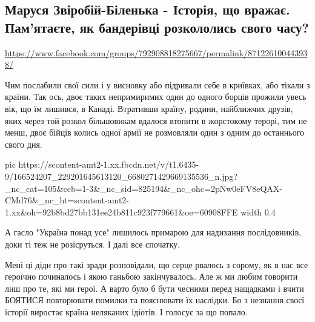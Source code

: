  
 
 
 
 

\subsection{Маруся Звіробій-Біленька - Історія, що вражає. Пам'ятаєте, як бандерівці розкололись свого часу? }
\url{https://www.facebook.com/groups/792908818275667/permalink/871226100443938/}

Чим послабили свої сили і у висновку або підривали себе в криївках, або тікали
з країни. Так ось, двоє таких непримиримих один до одного борців прожили увесь
вік, що їм лишився, в Канаді. Втративши країну, родини, найближчих друзів, яких
через той розкол більшовикам вдалося втопити в жорстокому терорі, тим не менш,
двоє бійців колись одної армії не розмовляли один з одним до останнього свого
дня. 


\ifcmt
  pic https://scontent-amt2-1.xx.fbcdn.net/v/t1.6435-9/166524207_229201645613120_6680271429669135536_n.jpg?_nc_cat=105&ccb=1-3&_nc_sid=825194&_nc_ohc=2pNw0eFV8eQAX-CMd76&_nc_ht=scontent-amt2-1.xx&oh=92b8bd27bb131ee24b811c923f779661&oe=60908FFE
  width 0.4
\fi


А гасло "Україна понад усе" лишилось примарою для надихання послідовників, доки
ті теж не розісруться. І далі все спочатку. 

Мені ці діди про такі зради розповідали, що серце рвалось з сорому, як в нас
все героїчно починалось і якою ганьбою закінчувалось. Але ж ми любим говорити
лиш про те, які ми герої. А варто було б бути чесними перед нащадками і вчити
БОЯТИСЯ повторювати помилки та пояснювати їх наслідки. Бо з незнання своєї
історії виростає країна неляканих ідіотів. І голосує за що попало.
